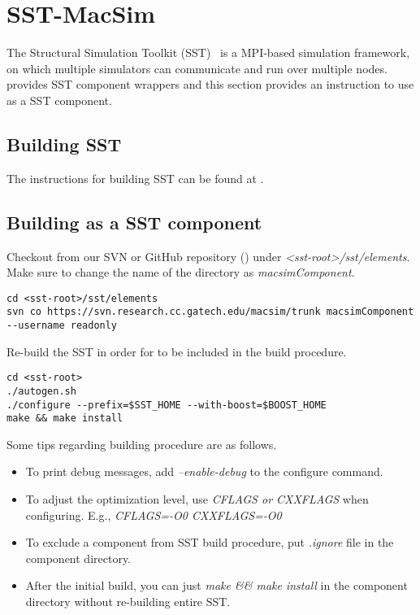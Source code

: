 \section{SST-MacSim}
\label{sec:sst}

The Structural Simulation Toolkit (SST)~\cite{sst} is a MPI-based 
simulation framework, on which multiple simulators can communicate 
and run over multiple nodes. 
\SIM provides SST component wrappers and this section provides 
an instruction to use \SIM as a SST component.


\subsection{Building SST}

The instructions for building SST can be found at 
.


\subsection{Building \SIM as a SST component}

Checkout \SIM from our SVN or GitHub repository () under \textit{<sst-root>/sst/elements}.
Make sure to change the name of the directory as \textit{macsimComponent}.

\begin{Verbatim}
cd <sst-root>/sst/elements
svn co https://svn.research.cc.gatech.edu/macsim/trunk macsimComponent
--username readonly 
\end{Verbatim}
Re-build the SST in order for \SIM to be included in the build procedure.

\begin{Verbatim}
cd <sst-root>
./autogen.sh
./configure --prefix=$SST_HOME --with-boost=$BOOST_HOME
make && make install
\end{Verbatim}
Some tips regarding building procedure are as follows.
\begin{itemize}
  \item To print debug messages, add \textit{--enable-debug} to the configure command.
  \item To adjust the optimization level, use \textit{CFLAGS or CXXFLAGS} when configuring. E.g., \textit{CFLAGS=-O0 CXXFLAGS=-O0}
  \item To exclude a component from SST build procedure, put \textit{.ignore} file in the component directory.
  \item After the initial build, you can just \textit{make \&\& make install} in the component directory without re-building entire SST.
\end{itemize}




